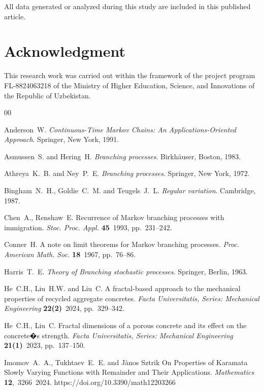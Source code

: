 \documentclass[10pt,reqno]{amsart}
\theoremstyle{definition}
\numberwithin{equation}{section}
\begin{document}
    All data generated or analyzed during this study are included in this published article.


\section*{Acknowledgment}

    This research work was carried out within the framework of the project program FL-8824063218 of
    the Ministry of Higher Education, Science, and Innovations of the Republic of Uzbekistan.




\begin{thebibliography}{00}

    {\sc Anderson~W.}
    \textit{Continuous-Time Markov Chains: An Applications-Oriented Approach}. Springer, New York, 1991.

    {\sc Asmussen~S. and Hering~H.}
    \textit{Branching processes}. Birkh\"{a}user, Boston, 1983.

    {\sc Athreya~K.~B. and  Ney~P.~E.}
    \textit{Branching processes}. Springer, New York, 1972.

    {\sc Bingham~N.~H., Goldie~C.~M. and Teugels~J.~L.}
    \textit{Regular variation}. Cambridge, 1987.

    {\sc Chen~A., Renshaw~E.}
    {Recurrence of Markov branching processes with immigration.}
    \textit{Stoc. Proc. Appl.} \textbf{45}~1993, pp.~231--242.

    {\sc Conner~H.}
    {A note on limit theorems for Markov branching processes.}
    \textit{Proc. American Math. Soc.} \textbf{18}~1967, pp.~76--86.

    {\sc Harris~T.~E.}
    \textit{Theory of Branching stochastic processes}. Springer, Berlin, 1963.

    {\sc He~C.H., Liu~H.W. and Liu~C.}
    {A fractal-based approach to the mechanical properties of recycled aggregate concretes.}
    \textit{Facta Universitatis, Series: Mechanical Engineering} \textbf{22(2)}~2024, pp.~329--342.

    {\sc He~C.H., Liu~C.}
    {Fractal dimensions of a porous concrete and its effect on the concrete�s strength.}
    \textit{Facta Universitatis, Series: Mechanical Engineering} \textbf{21(1)}~2023, pp.~137--150.

    {\sc Imomov~A.~A., Tukhtaev~E.~E. and J\`{a}nos Sztrik}
    {On Properties of Karamata Slowly Varying Functions with Remainder and Their Applications.}
    \textit{Mathematics} \textbf{12},~3266~2024. https://doi.org/10.3390/math12203266


\end{thebibliography}
\end{document}
